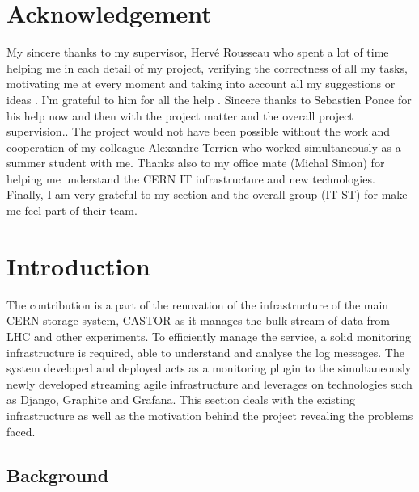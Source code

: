 \documentclass[11pt, letterpaper]{article}            %
\newcommand{\footrulecolor}[1]{\patchcmd{\footrule}{\hrule}{\color{#1}\hrule}{}{}} %
\begin{document}
\newpage

\section*{Acknowledgement}
My sincere thanks to my supervisor, Hervé Rousseau who spent a lot of time helping me in each detail of my project, verifying the correctness of all my tasks, motivating me at every moment and taking into account all my suggestions or ideas . I'm grateful to him for all the help . Sincere thanks to Sebastien Ponce for his help now and then with the project matter and the overall project supervision.. The project would not have been possible without the work and cooperation of my colleague Alexandre Terrien who worked simultaneously as a summer student with me. Thanks also to my office mate (Michal Simon) for helping me understand the CERN IT infrastructure and new technologies. Finally, I am very grateful to my section and the overall group (IT-ST) for make me feel part of their team.


\newpage


{\fontsize{11}{13}\sffamily\linespread{1.750}\selectfont\tableofcontents}
\thispagestyle{fancy}\newpage

\fancyfoot{} %
\renewcommand{\footrulewidth}{0.4pt} %
\footrulecolor{linec}

\section{Introduction}
The contribution is a part of the renovation of the infrastructure of the main CERN storage system, CASTOR as it manages the bulk stream of data from LHC and other experiments. To efficiently manage the service, a solid monitoring infrastructure is required, able to understand and analyse the log messages. The system developed and deployed acts as a monitoring plugin to the simultaneously newly developed streaming agile infrastructure and leverages on technologies such as Django, Graphite and Grafana. This section deals with the existing infrastructure as well as the motivation behind the project revealing the problems faced.

\subsection{Background}
\end{document}
